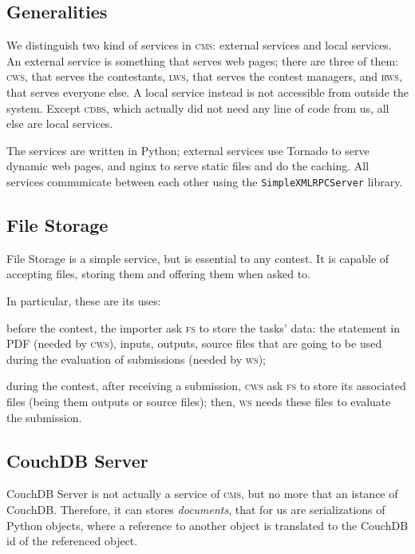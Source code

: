 \documentclass[a4paper,8pt]{amsart}
\newcommand{\CMS}{\textsc{cms}}
\newcommand{\FS}{\textsc{fs}}
\newcommand{\CDBS}{\textsc{cdbs}}
\newcommand{\CWS}{\textsc{cws}}
\newcommand{\WS}{\textsc{ws}}
\newcommand{\LWS}{\textsc{lws}}
\newcommand{\RWS}{\textsc{rws}}
\newenvironment{squishlist}{%
  \begin{list}{\textbullet}%
    { \setlength{\itemsep}{0pt}%
      \setlength{\parsep}{3pt}%
      \setlength{\topsep}{3pt}%
      \setlength{\partopsep}{0pt}%
      \setlength{\leftmargin}{1.5em}%
      \setlength{\labelwidth}{1em}%
      \setlength{\labelsep}{0.5em} }%
}{\end{list}}
\begin{document}
\begin{multicols}{2}
  \subsection{Generalities}

  We distinguish two kind of services in \CMS{}: external services and
  local services. An external service is something that serves web
  pages; there are three of them: \CWS{}, that serves the contestants,
  \LWS{}, that serves the contest managers, and \RWS{}, that serves
  everyone else. A local service instead is not accessible from
  outside the system. Except \CDBS{}, which actually did not need any
  line of code from us, all else are local services.

  The services are written in Python; external services use Tornado to
  serve dynamic web pages, and nginx to serve static files and do the
  caching. All services communicate between each other using the
  \texttt{SimpleXMLRPCServer} library.

  \subsection{File Storage}

  File Storage is a simple service, but is essential to any
  contest. It is capable of accepting files, storing them and offering
  them when asked to.

  In particular, these are its uses:
  \begin{squishlist}
  \item before the contest, the importer ask \FS{} to store the tasks'
    data: the statement in PDF (needed by \CWS{}), inputs, outputs,
    source files that are going to be used during the evaluation of
    submissions (needed by \WS{});
  \item during the contest, after receiving a submission, \CWS{} ask
    \FS{} to store its associated files (being them outputs or source
    files); then, \WS{} needs these files to evaluate the submission.
  \end{squishlist}

  \subsection{CouchDB Server}

  CouchDB Server is not actually a service of \CMS{}, but no more that
  an istance of CouchDB. Therefore, it can stores \emph{documents\/},
  that for us are serializations of Python objects, where a reference
  to another object is translated to the CouchDB id of the referenced
  object.


\end{multicols}
\end{document}
